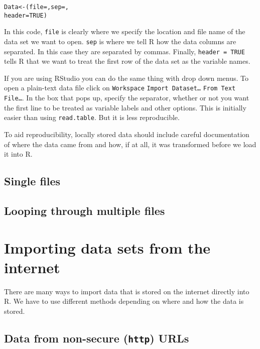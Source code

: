 \begin{knitrout}
\color{fgcolor}\begin{kframe}
\begin{alltt}
Data <- (file = , sep = ,
                    header = TRUE)
\end{alltt}
\end{kframe}
\end{knitrout}


In this code, \texttt{file} is clearly where we specify the location and file name of the data set we want to open. \texttt{sep} is where we tell R how the data columns are separated. In this case they are separated by commas. Finally, \texttt{header = TRUE} tells R that we want to treat the first row of the data set as the variable names. 

If you are using RStudio you can do the same thing with drop down menus. To open a plain-text data file click on \texttt{Workspace} \textrightarrow \texttt{Import Dataset\ldots} \textrightarrow \texttt{From Text File\ldots}. In the box that pops up, specify the separator, whether or not you want the first line to be treated as variable labels and other options. This is initially easier than using \texttt{read.table}. But it is less reproducible.

To aid reproducibility, locally stored data should include careful documentation of where the data came from and how, if at all, it was transformed before we load it into R.

\subsection{Single files}

\subsection{Looping through multiple files}

\section{Importing data sets from the internet}

There are many ways to import data that is stored on the internet directly into R. We have to use different methods depending on where and how the data is stored. 

\subsection{Data from non-secure ({\tt{http}}) URLs}

